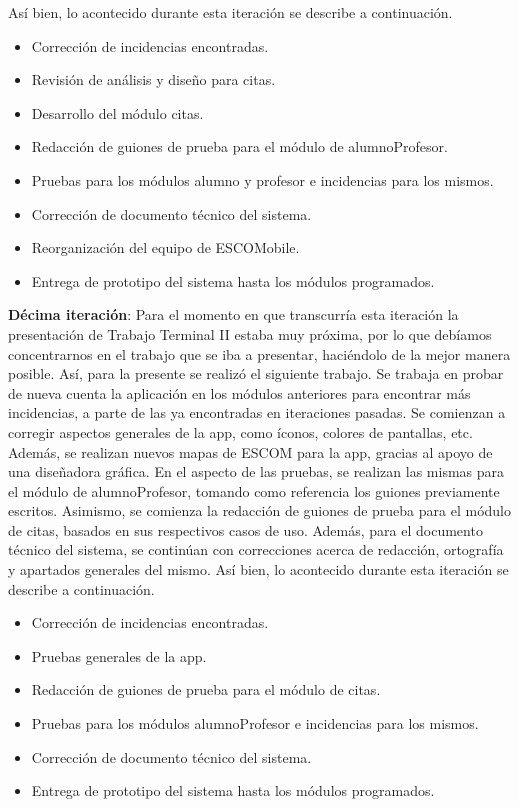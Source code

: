 \newline
Así bien, lo acontecido durante esta iteración se describe a continuación. 
\begin{itemize}
	\item Corrección de incidencias encontradas.
	\item Revisión de análisis y diseño para citas.
	\item Desarrollo del módulo citas.
	\item Redacción de guiones de prueba para el módulo de alumnoProfesor.
	\item Pruebas para los módulos alumno y profesor e incidencias para los mismos.
	\item Corrección de documento técnico del sistema.
	\item Reorganización del equipo de ESCOMobile.
	\item Entrega de prototipo del sistema hasta los módulos programados.
\end{itemize}

\noindent
\newline
\textbf{Décima iteración}: Para el momento en que transcurría esta iteración la presentación de Trabajo Terminal II estaba muy próxima, por lo que debíamos concentrarnos en el trabajo que se iba a presentar, haciéndolo de la mejor manera posible. Así, para la presente se realizó el siguiente trabajo. 
\newline
\newline
Se trabaja en probar de nueva cuenta la aplicación en los módulos anteriores para encontrar más incidencias, a parte de las ya encontradas en iteraciones pasadas. Se comienzan a corregir aspectos generales de la app, como íconos, colores de pantallas, etc. Además, se realizan nuevos mapas de ESCOM para la app, gracias al apoyo de una diseñadora gráfica.
\newline
En el aspecto de las pruebas, se realizan las mismas para el módulo de alumnoProfesor, tomando como referencia los guiones previamente escritos. Asimismo, se comienza la redacción de guiones de prueba para el módulo de citas, basados en sus respectivos casos de uso. 
\newline
Además, para el documento técnico del sistema, se continúan con correcciones acerca de redacción, ortografía y apartados generales del mismo.
\newline
Así bien, lo acontecido durante esta iteración se describe a continuación. 
\begin{itemize}
	\item Corrección de incidencias encontradas.
	\item Pruebas generales de la app. 
	\item Redacción de guiones de prueba para el módulo de citas.
	\item Pruebas para los módulos alumnoProfesor e incidencias para los mismos.
	\item Corrección de documento técnico del sistema.
	\item Entrega de prototipo del sistema hasta los módulos programados.
\end{itemize}

